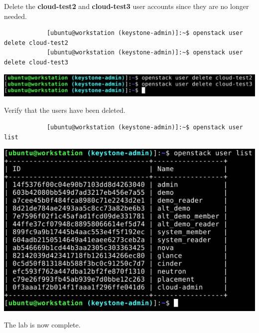 \documentclass[letterpaper, 12pt]{article}
\begin{document}
\begin{enumerate}
    \begin{labstep}
        Delete the \textbf{cloud-test2} and \textbf{cloud-test3} user accounts since they are no longer needed.
        \begin{lstlisting}
            [ubuntu@workstation (keystone-admin)]:~$ openstack user delete cloud-test2
            [ubuntu@workstation (keystone-admin)]:~$ openstack user delete cloud-test3
        \end{lstlisting}

        \begin{center}
            \includegraphics[width=\linewidth]{images/part4/step21.png}
        \end{center}
    \end{labstep}

    \begin{labstep}
        Verify that the users have been deleted.
        \begin{lstlisting}
            [ubuntu@workstation (keystone-admin)]:~$ openstack user list
        \end{lstlisting}

        \begin{center}
            \includegraphics[width=\linewidth]{images/part4/step22.png}
        \end{center}
    \end{labstep}

    \begin{labstep}
        The lab is now complete.
    \end{labstep}
\end{enumerate}
\end{document}
